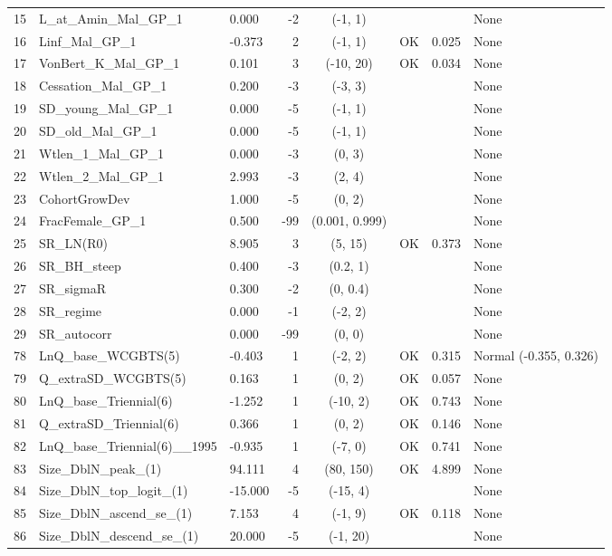 \documentclass[12pt,]{article}
\begin{document}
\begin{landscape}
\begin{longtable}{lp{2.5in}lrcccl}
  15 & L\_at\_Amin\_Mal\_GP\_1 & 0.000 & -2 & (-1, 1) &  &  & None \\ 
  16 & Linf\_Mal\_GP\_1 & -0.373 & 2 & (-1, 1) & OK & 0.025 & None \\ 
  17 & VonBert\_K\_Mal\_GP\_1 & 0.101 & 3 & (-10, 20) & OK & 0.034 & None \\ 
  18 & Cessation\_Mal\_GP\_1 & 0.200 & -3 & (-3, 3) &  &  & None \\ 
  19 & SD\_young\_Mal\_GP\_1 & 0.000 & -5 & (-1, 1) &  &  & None \\ 
  20 & SD\_old\_Mal\_GP\_1 & 0.000 & -5 & (-1, 1) &  &  & None \\ 
  21 & Wtlen\_1\_Mal\_GP\_1 & 0.000 & -3 & (0, 3) &  &  & None \\ 
  22 & Wtlen\_2\_Mal\_GP\_1 & 2.993 & -3 & (2, 4) &  &  & None \\ 
  23 & CohortGrowDev & 1.000 & -5 & (0, 2) &  &  & None \\ 
  24 & FracFemale\_GP\_1 & 0.500 & -99 & (0.001, 0.999) &  &  & None \\ 
  25 & SR\_LN(R0) & 8.905 & 3 & (5, 15) & OK & 0.373 & None \\ 
  26 & SR\_BH\_steep & 0.400 & -3 & (0.2, 1) &  &  & None \\ 
  27 & SR\_sigmaR & 0.300 & -2 & (0, 0.4) &  &  & None \\ 
  28 & SR\_regime & 0.000 & -1 & (-2, 2) &  &  & None \\ 
  29 & SR\_autocorr & 0.000 & -99 & (0, 0) &  &  & None \\ 
  78 & LnQ\_base\_WCGBTS(5) & -0.403 & 1 & (-2, 2) & OK & 0.315 & Normal (-0.355, 0.326) \\ 
  79 & Q\_extraSD\_WCGBTS(5) & 0.163 & 1 & (0, 2) & OK & 0.057 & None \\ 
  80 & LnQ\_base\_Triennial(6) & -1.252 & 1 & (-10, 2) & OK & 0.743 & None \\ 
  81 & Q\_extraSD\_Triennial(6) & 0.366 & 1 & (0, 2) & OK & 0.146 & None \\ 
  82 & LnQ\_base\_Triennial(6)\_\_1995 & -0.935 & 1 & (-7, 0) & OK & 0.741 & None \\ 
  83 & Size\_DblN\_peak\_(1) & 94.111 & 4 & (80, 150) & OK & 4.899 & None \\ 
  84 & Size\_DblN\_top\_logit\_(1) & -15.000 & -5 & (-15, 4) &  &  & None \\ 
  85 & Size\_DblN\_ascend\_se\_(1) & 7.153 & 4 & (-1, 9) & OK & 0.118 & None \\ 
  86 & Size\_DblN\_descend\_se\_(1) & 20.000 & -5 & (-1, 20) &  &  & None \\ 

\end{longtable}
\end{landscape}
\end{document}

